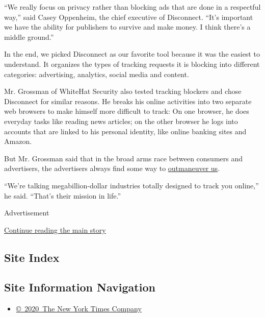 ``We really focus on privacy rather than blocking ads that are done in a
respectful way,'' said Casey Oppenheim, the chief executive of
Disconnect. ``It's important we have the ability for publishers to
survive and make money. I think there's a middle ground.''

In the end, we picked Disconnect as our favorite tool because it was the
easiest to understand. It organizes the types of tracking requests it is
blocking into different categories: advertising, analytics, social media
and content.

Mr. Grossman of WhiteHat Security also tested tracking blockers and
chose Disconnect for similar reasons. He breaks his online activities
into two separate web browsers to make himself more difficult to track:
On one browser, he does everyday tasks like reading news articles; on
the other browser he logs into accounts that are linked to his personal
identity, like online banking sites and Amazon.

But Mr. Grossman said that in the broad arms race between consumers and
advertisers, the advertisers always find some way to
\href{https://blog.whitehatsec.com/the-ad-blocking-wars-ad-blockers-vs-ad-tech/}{outmaneuver
us}.

``We're talking megabillion-dollar industries totally designed to track
you online,'' he said. ``That's their mission in life.''

Advertisement

\protect\hyperlink{after-bottom}{Continue reading the main story}

\hypertarget{site-index}{%
\subsection{Site Index}\label{site-index}}

\hypertarget{site-information-navigation}{%
\subsection{Site Information
Navigation}\label{site-information-navigation}}

\begin{itemize}
\tightlist
\item
  \href{https://help.nytimes3xbfgragh.onion/hc/en-us/articles/115014792127-Copyright-notice}{©~2020~The
  New York Times Company}
\end{itemize}

